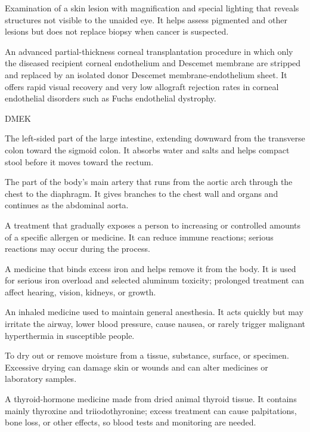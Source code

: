  Examination of a skin lesion with magnification and special lighting that reveals structures not visible to the unaided eye. It helps assess pigmented and other lesions but does not replace biopsy when cancer is suspected.

 An advanced partial-thickness corneal transplantation procedure in which only the diseased recipient corneal endothelium and Descemet membrane are stripped and replaced by an isolated donor Descemet membrane-endothelium sheet. It offers rapid visual recovery and very low allograft rejection rates in corneal endothelial disorders such as Fuchs endothelial dystrophy.

\synonyms
DMEK

 The left-sided part of the large intestine, extending downward from the transverse colon toward the sigmoid colon. It absorbs water and salts and helps compact stool before it moves toward the rectum.

 The part of the body’s main artery that runs from the aortic arch through the chest to the diaphragm. It gives branches to the chest wall and organs and continues as the abdominal aorta.

 A treatment that gradually exposes a person to increasing or controlled amounts of a specific allergen or medicine. It can reduce immune reactions; serious reactions may occur during the process.

 A medicine that binds excess iron and helps remove it from the body. It is used for serious iron overload and selected aluminum toxicity; prolonged treatment can affect hearing, vision, kidneys, or growth.

 An inhaled medicine used to maintain general anesthesia. It acts quickly but may irritate the airway, lower blood pressure, cause nausea, or rarely trigger malignant hyperthermia in susceptible people.

 To dry out or remove moisture from a tissue, substance, surface, or specimen. Excessive drying can damage skin or wounds and can alter medicines or laboratory samples.

 A thyroid-hormone medicine made from dried animal thyroid tissue. It contains mainly thyroxine and triiodothyronine; excess treatment can cause palpitations, bone loss, or other effects, so blood tests and monitoring are needed.

